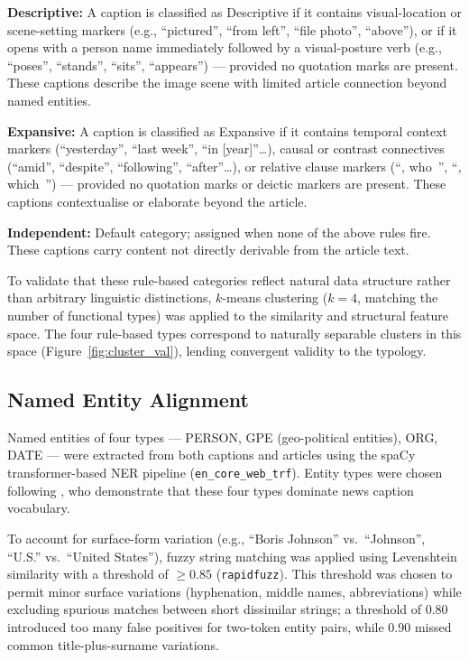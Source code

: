 \documentclass[11pt,a4paper]{article}
\begin{document}
\textbf{Descriptive:} A caption is classified as Descriptive if it
contains visual-location or scene-setting markers (e.g., ``pictured'',
``from left'', ``file photo'', ``above''), or if it opens with a person
name immediately followed by a visual-posture verb (e.g., ``poses'',
``stands'', ``sits'', ``appears'') --- provided no quotation marks are
present. These captions describe the image scene with limited article
connection beyond named entities.

\textbf{Expansive:} A caption is classified as Expansive if it contains
temporal context markers (``yesterday'', ``last week'', ``in [year]''\ldots),
causal or contrast connectives (``amid'', ``despite'', ``following'',
``after''\ldots), or relative clause markers (``\textit{,} who~'',
``\textit{,} which~'') --- provided no quotation marks or deictic markers
are present. These captions contextualise or elaborate beyond the article.

\textbf{Independent:} Default category; assigned when none of the above
rules fire. These captions carry content not directly derivable from the
article text.

To validate that these rule-based categories reflect natural data
structure rather than arbitrary linguistic distinctions, $k$-means
clustering ($k = 4$, matching the number of functional types) was applied
to the similarity and structural feature space. The four rule-based types
correspond to naturally separable clusters in this space (Figure~\ref{fig:cluster_val}),
lending convergent validity to the typology.

\subsection{Named Entity Alignment}

Named entities of four types --- PERSON, GPE (geo-political entities),
ORG, DATE --- were extracted from both captions and articles using the
spaCy transformer-based NER pipeline (\texttt{en\_core\_web\_trf}).
Entity types were chosen following \citet{liu2021visualnews}, who
demonstrate that these four types dominate news caption vocabulary.

To account for surface-form variation (e.g., ``Boris Johnson'' vs.\
``Johnson'', ``U.S.'' vs.\ ``United States''), fuzzy string matching
was applied using Levenshtein similarity with a threshold of $\geq 0.85$
(\texttt{rapidfuzz}). This threshold was chosen to permit minor surface
variations (hyphenation, middle names, abbreviations) while excluding
spurious matches between short dissimilar strings; a threshold of 0.80
introduced too many false positives for two-token entity pairs, while
0.90 missed common title-plus-surname variations.
\end{document}
